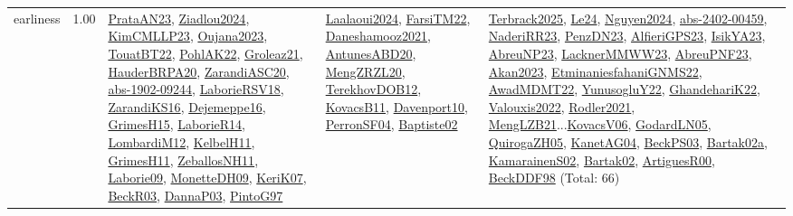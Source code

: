 {\begin{longtable}{p{3cm}r>{\raggedright\arraybackslash}p{6cm}>{\raggedright\arraybackslash}p{6cm}>{\raggedright\arraybackslash}p{8cm}}
\index{earliness}\index{Concepts!earliness}earliness &  1.00 & \hyperref[detail:PrataAN23]{PrataAN23}, \hyperref[detail:Ziadlou2024]{Ziadlou2024}, \hyperref[detail:KimCMLLP23]{KimCMLLP23}, \hyperref[detail:Oujana2023]{Oujana2023}, \hyperref[detail:TouatBT22]{TouatBT22}, \hyperref[detail:PohlAK22]{PohlAK22}, \hyperref[detail:Groleaz21]{Groleaz21}, \hyperref[detail:HauderBRPA20]{HauderBRPA20}, \hyperref[detail:ZarandiASC20]{ZarandiASC20}, \hyperref[detail:abs-1902-09244]{abs-1902-09244}, \hyperref[detail:LaborieRSV18]{LaborieRSV18}, \hyperref[detail:ZarandiKS16]{ZarandiKS16}, \hyperref[detail:Dejemeppe16]{Dejemeppe16}, \hyperref[detail:GrimesH15]{GrimesH15}, \hyperref[detail:LaborieR14]{LaborieR14}, \hyperref[detail:LombardiM12]{LombardiM12}, \hyperref[detail:KelbelH11]{KelbelH11}, \hyperref[detail:GrimesH11]{GrimesH11}, \hyperref[detail:ZeballosNH11]{ZeballosNH11}, \hyperref[detail:Laborie09]{Laborie09}, \hyperref[detail:MonetteDH09]{MonetteDH09}, \hyperref[detail:KeriK07]{KeriK07}, \hyperref[detail:BeckR03]{BeckR03}, \hyperref[detail:DannaP03]{DannaP03}, \hyperref[detail:PintoG97]{PintoG97} & \hyperref[detail:Laalaoui2024]{Laalaoui2024}, \hyperref[detail:FarsiTM22]{FarsiTM22}, \hyperref[detail:Daneshamooz2021]{Daneshamooz2021}, \hyperref[detail:AntunesABD20]{AntunesABD20}, \hyperref[detail:MengZRZL20]{MengZRZL20}, \hyperref[detail:TerekhovDOB12]{TerekhovDOB12}, \hyperref[detail:KovacsB11]{KovacsB11}, \hyperref[detail:Davenport10]{Davenport10}, \hyperref[detail:PerronSF04]{PerronSF04}, \hyperref[detail:Baptiste02]{Baptiste02} & \hyperref[detail:Terbrack2025]{Terbrack2025}, \hyperref[detail:Le24]{Le24}, \hyperref[detail:Nguyen2024]{Nguyen2024}, \hyperref[detail:abs-2402-00459]{abs-2402-00459}, \hyperref[detail:NaderiRR23]{NaderiRR23}, \hyperref[detail:PenzDN23]{PenzDN23}, \hyperref[detail:AlfieriGPS23]{AlfieriGPS23}, \hyperref[detail:IsikYA23]{IsikYA23}, \hyperref[detail:AbreuNP23]{AbreuNP23}, \hyperref[detail:LacknerMMWW23]{LacknerMMWW23}, \hyperref[detail:AbreuPNF23]{AbreuPNF23}, \hyperref[detail:Akan2023]{Akan2023}, \hyperref[detail:EtminaniesfahaniGNMS22]{EtminaniesfahaniGNMS22}, \hyperref[detail:AwadMDMT22]{AwadMDMT22}, \hyperref[detail:YunusogluY22]{YunusogluY22}, \hyperref[detail:GhandehariK22]{GhandehariK22}, \hyperref[detail:Valouxis2022]{Valouxis2022}, \hyperref[detail:Rodler2021]{Rodler2021}, \hyperref[detail:MengLZB21]{MengLZB21}...\hyperref[detail:KovacsV06]{KovacsV06}, \hyperref[detail:GodardLN05]{GodardLN05}, \hyperref[detail:QuirogaZH05]{QuirogaZH05}, \hyperref[detail:KanetAG04]{KanetAG04}, \hyperref[detail:BeckPS03]{BeckPS03}, \hyperref[detail:Bartak02a]{Bartak02a}, \hyperref[detail:KamarainenS02]{KamarainenS02}, \hyperref[detail:Bartak02]{Bartak02}, \hyperref[detail:ArtiguesR00]{ArtiguesR00}, \hyperref[detail:BeckDDF98]{BeckDDF98} (Total: 66)\\

\end{longtable}}
